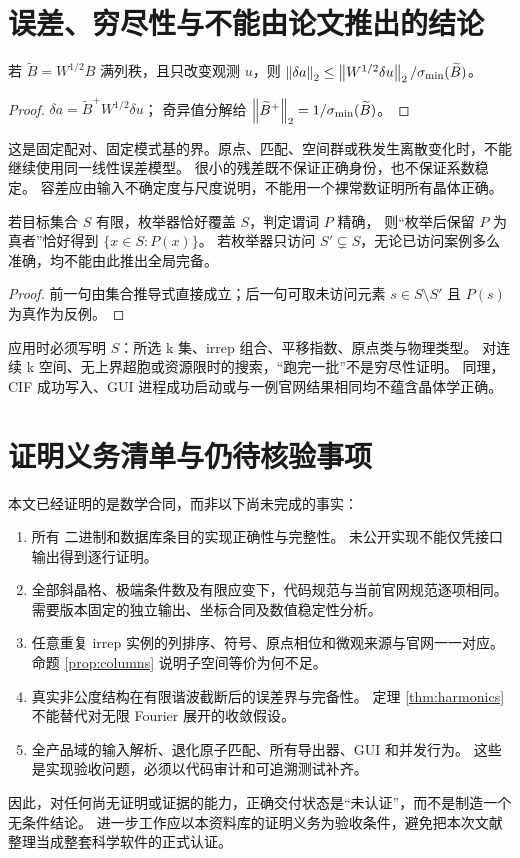 \section{误差、穷尽性与不能由论文推出的结论}\label{sec:validation}
\begin{proposition}[固定模型下的扰动界]
若 $\widetilde B=W^{1/2}B$ 满列秩，且只改变观测 $u$，则
$\left\lVert \delta a\right\rVert_2\leq
\left\lVert W^{1/2}\delta u\right\rVert_2/\sigma_{\min}(\widetilde B)$。
\end{proposition}
\begin{proof}
$\delta a=\widetilde B^+W^{1/2}\delta u$；
奇异值分解给 $\left\lVert \widetilde B^+\right\rVert_2=1/\sigma_{\min}(\widetilde B)$。
\end{proof}
这是固定配对、固定模式基的界。原点、匹配、空间群或秩发生离散变化时，不能继续使用同一线性误差模型。
很小的残差既不保证正确身份，也不保证系数稳定。
容差应由输入不确定度与尺度说明，不能用一个裸常数证明所有晶体正确。

\begin{proposition}[有界搜索的条件性完备性]
若目标集合 $S$ 有限，枚举器恰好覆盖 $S$，判定谓词 $P$ 精确，
则“枚举后保留 $P$ 为真者”恰好得到 $\{x\in S:P(x)\}$。
若枚举器只访问 $S'\subsetneq S$，无论已访问案例多么准确，均不能由此推出全局完备。
\end{proposition}
\begin{proof}
前一句由集合推导式直接成立；后一句可取未访问元素 $s\in S\setminus S'$ 且 $P(s)$ 为真作为反例。
\end{proof}
应用时必须写明 $S$：所选 k 集、irrep 组合、平移指数、原点类与物理类型。
对连续 k 空间、无上界超胞或资源限时的搜索，“跑完一批”不是穷尽性证明。
同理，CIF 成功写入、GUI 进程成功启动或与一例官网结果相同均不蕴含晶体学正确。

\section{证明义务清单与仍待核验事项}\label{sec:obligations}
本文已经证明的是数学合同，而非以下尚未完成的事实：
\begin{enumerate}
\item 所有  二进制和数据库条目的实现正确性与完整性。
未公开实现不能仅凭接口输出得到逐行证明。
\item 全部斜晶格、极端条件数及有限应变下，代码规范与当前官网规范逐项相同。
需要版本固定的独立输出、坐标合同及数值稳定性分析。
\item 任意重复 irrep 实例的列排序、符号、原点相位和微观来源与官网一一对应。
命题 \ref{prop:columns} 说明子空间等价为何不足。
\item 真实非公度结构在有限谐波截断后的误差界与完备性。
定理 \ref{thm:harmonics} 不能替代对无限 Fourier 展开的收敛假设。
\item 全产品域的输入解析、退化原子匹配、所有导出器、GUI 和并发行为。
这些是实现验收问题，必须以代码审计和可追溯测试补齐。
\end{enumerate}
因此，对任何尚无证明或证据的能力，正确交付状态是“未认证”，而不是制造一个无条件结论。
进一步工作应以本资料库的证明义务为验收条件，避免把本次文献整理当成整套科学软件的正式认证。

